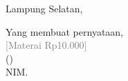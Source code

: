 \vspace{0.4cm}
Lampung Selatan, \printtanggallaporan

\begin{flushright}
	\begin{minipage}{0.45\textwidth}\centering\singlespacing
		Yang membuat pernyataan,\\[0.6cm]
		\textcolor{gray}{[Materai Rp10.000]}\\[0.6cm]
		(\theauthor)\\
		NIM. \printnim
	\end{minipage}
\end{flushright}
\endgroup
\clearpage
